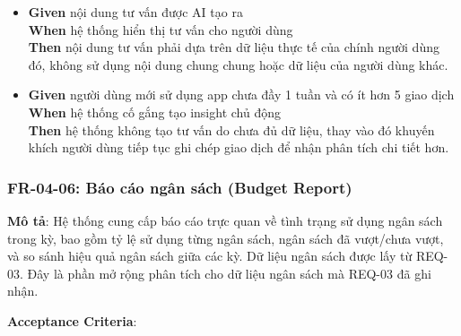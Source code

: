 \begin{itemize}
\item \textbf{Given} nội dung tư vấn được AI tạo ra  \\ \hspace*{1.5em}  \textbf{When} hệ thống hiển thị tư vấn cho người dùng  \\ \hspace*{1.5em}  \textbf{Then} nội dung tư vấn phải dựa trên dữ liệu thực tế của chính người dùng đó, không sử dụng nội dung chung chung hoặc dữ liệu của người dùng khác.
\item \textbf{Given} người dùng mới sử dụng app chưa đầy 1 tuần và có ít hơn 5 giao dịch  \\ \hspace*{1.5em}  \textbf{When} hệ thống cố gắng tạo insight chủ động  \\ \hspace*{1.5em}  \textbf{Then} hệ thống không tạo tư vấn do chưa đủ dữ liệu, thay vào đó khuyến khích người dùng tiếp tục ghi chép giao dịch để nhận phân tích chi tiết hơn.
\end{itemize}
\subsubsection{FR-04-06: Báo cáo ngân sách (Budget Report)}

\textbf{Mô tả}: Hệ thống cung cấp báo cáo trực quan về tình trạng sử dụng ngân sách trong kỳ, bao gồm tỷ lệ sử dụng từng ngân sách, ngân sách đã vượt/chưa vượt, và so sánh hiệu quả ngân sách giữa các kỳ. Dữ liệu ngân sách được lấy từ REQ-03. Đây là phần mở rộng phân tích cho dữ liệu ngân sách mà REQ-03 đã ghi nhận.



\textbf{Acceptance Criteria}:

